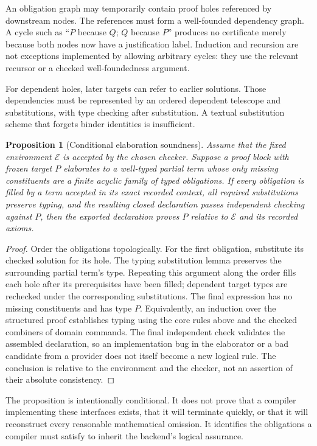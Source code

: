 \documentclass[11pt,a4paper]{article}
\newcommand{\Env}{\mathcal E}
\newtheorem{proposition}{Proposition}[section]
\theoremstyle{definition}
\theoremstyle{remark}
\begin{document}
An obligation graph may temporarily contain proof holes referenced by downstream nodes. The references must form a well-founded dependency graph. A cycle such as ``$P$ because $Q$; $Q$ because $P$'' produces no certificate merely because both nodes now have a justification label. Induction and recursion are not exceptions implemented by allowing arbitrary cycles: they use the relevant recursor or a checked well-foundedness argument.

For dependent holes, later targets can refer to earlier solutions. Those dependencies must be represented by an ordered dependent telescope and substitutions, with type checking after substitution. A textual substitution scheme that forgets binder identities is insufficient.

\begin{proposition}[Conditional elaboration soundness]
\label{prop:soundness}
Assume that the fixed environment $\Env$ is accepted by the chosen checker. Suppose a proof block with frozen target $P$ elaborates to a well-typed partial term whose only missing constituents are a finite acyclic family of typed obligations. If every obligation is filled by a term accepted in its exact recorded context, all required substitutions preserve typing, and the resulting closed declaration passes independent checking against $P$, then the exported declaration proves $P$ relative to $\Env$ and its recorded axioms.
\end{proposition}
\begin{proof}
Order the obligations topologically. For the first obligation, substitute its checked solution for its hole. The typing substitution lemma preserves the surrounding partial term's type. Repeating this argument along the order fills each hole after its prerequisites have been filled; dependent target types are rechecked under the corresponding substitutions. The final expression has no missing constituents and has type $P$. Equivalently, an induction over the structured proof establishes typing using the core rules above and the checked combiners of domain commands. The final independent check validates the assembled declaration, so an implementation bug in the elaborator or a bad candidate from a provider does not itself become a new logical rule. The conclusion is relative to the environment and the checker, not an assertion of their absolute consistency.
\end{proof}

The proposition is intentionally conditional. It does not prove that a compiler implementing these interfaces exists, that it will terminate quickly, or that it will reconstruct every reasonable mathematical omission. It identifies the obligations a compiler must satisfy to inherit the backend's logical assurance.
\end{document}

